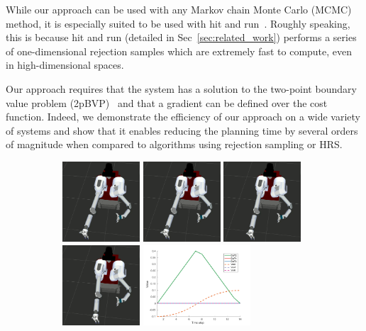 \documentclass[letterpaper, 10 pt, conference]{ieeeconf}  %
\begin{document}
While our approach can be used with any Markov chain Monte Carlo (MCMC) method, it is especially suited to be used with hit and run~\cite{S84,KSZ11}.
Roughly speaking, this is because hit and run (detailed in Sec~\ref{sec:related_work})
performs a series of one-dimensional rejection samples which are extremely fast to compute, even in high-dimensional spaces. 

Our approach requires that the system has a solution to the two-point boundary value problem (2pBVP)~\cite{L06, H02} and that a gradient can be defined over the cost function.
Indeed, we demonstrate the efficiency of our approach on a wide variety of systems and show that it enables reducing the planning time by several orders of magnitude when compared to algorithms using rejection sampling or HRS.

\begin{figure}[t!]
	\centering
	\begin{subfigure}[b]{\textwidth}
		\centering
		\includegraphics[height=3cm]{fig/motivation/slow1}
		\includegraphics[height=3cm]{fig/motivation/slow2}
		\includegraphics[height=3cm]{fig/motivation/slow3}
		\includegraphics[height=3cm]{fig/motivation/slow4}
		\includegraphics[height=3cm]{fig/motivation/slowmotion}

\end{subfigure}
\end{figure}
\end{document}
